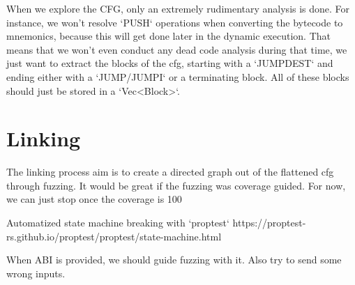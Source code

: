 \documentclass[letterpaper,12pt]{article}
\begin{document}
When we explore the CFG, only an extremely rudimentary analysis is done.
For instance, we won't resolve `PUSH` operations when converting the bytecode to mnemonics, because this will get done later in the dynamic execution.
That means that we won't even conduct any dead code analysis during that time, we just want to extract the blocks of the cfg, starting with a `JUMPDEST` and ending either with a `JUMP/JUMPI` or a terminating block.
All of these blocks should just be stored in a `Vec<Block>`.

\section{Linking}

The linking process aim is to create a directed graph out of the flattened cfg through fuzzing.
It would be great if the fuzzing was coverage guided.
For now, we can just stop once the coverage is 100%

Automatized state machine breaking with `proptest` https://proptest-rs.github.io/proptest/proptest/state-machine.html

When ABI is provided, we should guide fuzzing with it. Also try to send some wrong inputs.
\end{document}
